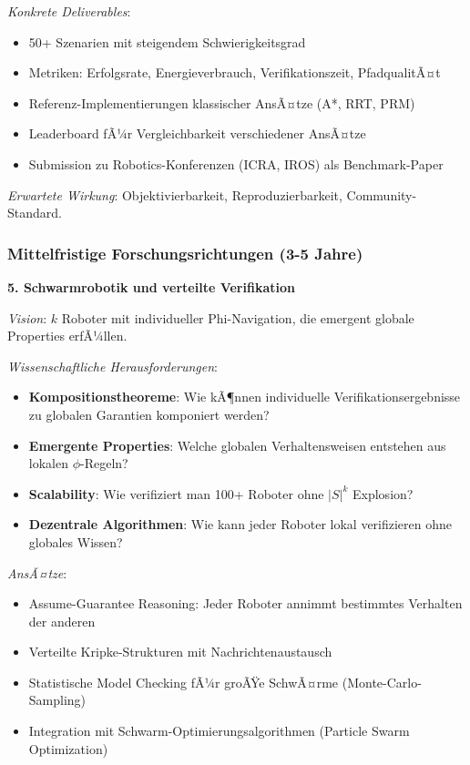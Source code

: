 ﻿\documentclass[a4paper,12pt]{article}
\theoremstyle{definition}
\begin{document}
\textit{Konkrete Deliverables}:
\begin{itemize}
	\item 50+ Szenarien mit steigendem Schwierigkeitsgrad
	\item Metriken: Erfolgsrate, Energieverbrauch, Verifikationszeit, PfadqualitÃ¤t
	\item Referenz-Implementierungen klassischer AnsÃ¤tze (A*, RRT, PRM)
	\item Leaderboard fÃ¼r Vergleichbarkeit verschiedener AnsÃ¤tze
	\item Submission zu Robotics-Konferenzen (ICRA, IROS) als Benchmark-Paper
\end{itemize}

\textit{Erwartete Wirkung}: Objektivierbarkeit, Reproduzierbarkeit, Community-Standard.

\subsubsection{Mittelfristige Forschungsrichtungen (3-5 Jahre)}

\textbf{5. Schwarmrobotik und verteilte Verifikation}

\textit{Vision}: $k$ Roboter mit individueller Phi-Navigation, die emergent globale Properties erfÃ¼llen.

\textit{Wissenschaftliche Herausforderungen}:
\begin{itemize}
	\item \textbf{Kompositionstheoreme}: Wie kÃ¶nnen individuelle Verifikationsergebnisse zu globalen Garantien komponiert werden?
	\item \textbf{Emergente Properties}: Welche globalen Verhaltensweisen entstehen aus lokalen $\phi$-Regeln?
	\item \textbf{Scalability}: Wie verifiziert man 100+ Roboter ohne $|S|^k$ Explosion?
	\item \textbf{Dezentrale Algorithmen}: Wie kann jeder Roboter lokal verifizieren ohne globales Wissen?
\end{itemize}

\textit{AnsÃ¤tze}:
\begin{itemize}
	\item Assume-Guarantee Reasoning: Jeder Roboter annimmt bestimmtes Verhalten der anderen
	\item Verteilte Kripke-Strukturen mit Nachrichtenaustausch
	\item Statistische Model Checking fÃ¼r groÃŸe SchwÃ¤rme (Monte-Carlo-Sampling)
	\item Integration mit Schwarm-Optimierungsalgorithmen (Particle Swarm Optimization)
\end{itemize}
\end{document}
